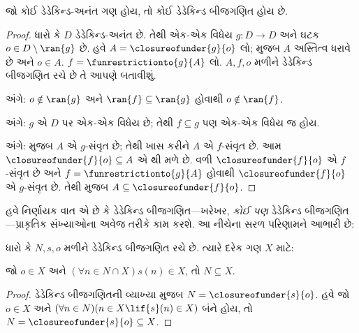 \begin{thm}
જો કોઈ ડેડેકિન્ડ-અનંત ગણ હોય, તો કોઈ ડેડેકિન્ડ બીજગણિત હોય છે.
\end{thm}

\begin{proof}
ધારો કે $D$ ડેડેકિન્ડ-અનંત છે. તેથી એક-એક વિધેય $g \colon D \to
D$ અને ઘટક $o \in D \setminus \ran{g}$ છે. હવે $A =
\closureofunder{g}{o}$ લો;  મુજબ $A$
અસ્તિત્વ ધરાવે છે અને $o \in A$. $f = \funrestrictionto{g}{A}$ લો.
$A, f, o$ મળીને ડેડેકિન્ડ બીજગણિત રચે છે તે આપણે બતાવીશું.

 અંગે: $o \notin \ran{g}$ અને $\ran{f}
\subseteq \ran{g}$ હોવાથી $o\notin \ran{f}$.

 અંગે: $g$ એ $D$ પર એક-એક વિધેય છે; તેથી
$f \subseteq g$ પણ એક-એક વિધેય જ હોય.

 અંગે:  મુજબ $A$ એ
$g$-સંવૃત છે; તેથી ખાસ કરીને $A$ એ $f$-સંવૃત છે. આમ
$\closureofunder{f}{o} \subseteq A$ એ થી મળે
છે. વળી $\closureofunder{f}{o}$ એ $f$-સંવૃત છે અને
$f = \funrestrictionto{g}{A}$ હોવાથી $\closureofunder{f}{o}$ એ
$g$-સંવૃત છે. તેથી  મુજબ
$A \subseteq \closureofunder{f}{o}$.
\end{proof}
\endgroup

\begingroup
\makeatletter{}\makeatother

\label{guunit:OLP-0052}


હવે નિર્ણાયક વાત એ છે કે ડેડેકિન્ડ બીજગણિત---ખરેખર, \emph{કોઈ પણ}
ડેડેકિન્ડ બીજગણિત---પ્રાકૃતિક સંખ્યાઓના અવેજ તરીકે કામ કરશે. આ નીચેના
સરળ પરિણામને આભારી છે:

\begin{thm}[ગાણિતિક અનુમાન]
ધારો કે $N, s, o$ મળીને ડેડેકિન્ડ બીજગણિત રચે છે. ત્યારે દરેક ગણ $X$ માટે:
	\begin{center}
		જો $o \in X$ અને $(\forall {n} \in N \cap X){s}({n}) \in X$, {તો} $N \subseteq X$.
	\end{center}
\end{thm}

\begin{proof}
ડેડેકિન્ડ બીજગણિતની વ્યાખ્યા મુજબ $N = \closureofunder{s}{o}$.
હવે જો ${o} \in X$ અને $(\forall {n} \in N)(n \in X \lif
{s}({n}) \in X)$ બંને હોય, તો $N = \closureofunder{s}{o} \subseteq X$.
\end{proof}

